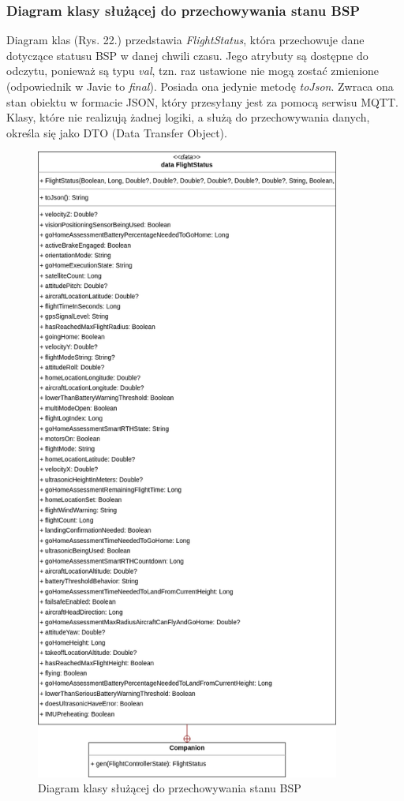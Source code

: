 \subsubsection{Diagram klasy służącej do przechowywania stanu BSP}

Diagram klas (Rys. 22.) przedstawia \textit{FlightStatus}, która przechowuje dane dotyczące statusu BSP w danej chwili czasu. Jego atrybuty są dostępne do odczytu, ponieważ są typu \textit{val}, tzn. raz ustawione nie mogą zostać zmienione (odpowiednik w Javie to \textit{final}). Posiada ona jedynie metodę \textit{toJson}. Zwraca ona stan obiektu w formacie JSON, który przesyłany jest za pomocą serwisu MQTT. Klasy, które nie realizują żadnej logiki, a służą do przechowywania danych, określa się jako DTO (Data Transfer Object).

\begin{figure}[!htbp]
\begin{center}
  \includegraphics[width=10cm]{./Obrazy/FlightStatus.png}
  \caption{Diagram klasy służącej do przechowywania stanu BSP}
\end{center}
\end{figure}

